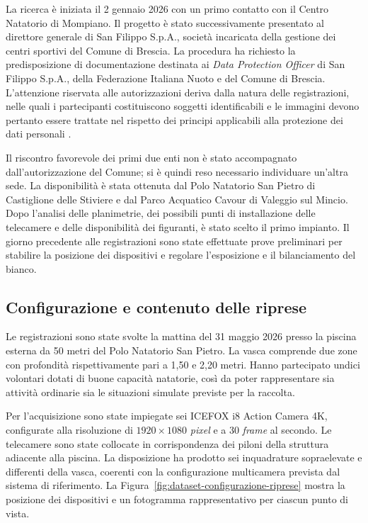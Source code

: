 La ricerca è iniziata il 2 gennaio 2026 con un primo contatto con il Centro Natatorio di Mompiano. Il progetto è stato successivamente presentato al direttore generale di San Filippo S.p.A., società incaricata della gestione dei centri sportivi del Comune di Brescia. La procedura ha richiesto la predisposizione di documentazione destinata ai \textit{Data Protection Officer} di San Filippo S.p.A., della Federazione Italiana Nuoto e del Comune di Brescia. L'attenzione riservata alle autorizzazioni deriva dalla natura delle registrazioni, nelle quali i partecipanti costituiscono soggetti identificabili e le immagini devono pertanto essere trattate nel rispetto dei principi applicabili alla protezione dei dati personali \cite{EU2016GDPR}.

Il riscontro favorevole dei primi due enti non è stato accompagnato dall'autorizzazione del Comune; si è quindi reso necessario individuare un'altra sede. La disponibilità è stata ottenuta dal Polo Natatorio San Pietro di Castiglione delle Stiviere e dal Parco Acquatico Cavour di Valeggio sul Mincio. Dopo l'analisi delle planimetrie, dei possibili punti di installazione delle telecamere e delle disponibilità dei figuranti, è stato scelto il primo impianto. Il giorno precedente alle registrazioni sono state effettuate prove preliminari per stabilire la posizione dei dispositivi e regolare l'esposizione e il bilanciamento del bianco.

\subsection{Configurazione e contenuto delle riprese}

Le registrazioni sono state svolte la mattina del 31 maggio 2026 presso la piscina esterna da 50 metri del Polo Natatorio San Pietro. La vasca comprende due zone con profondità rispettivamente pari a 1{,}50 e 2{,}20 metri. Hanno partecipato undici volontari dotati di buone capacità natatorie, così da poter rappresentare sia attività ordinarie sia le situazioni simulate previste per la raccolta.

Per l'acquisizione sono state impiegate sei ICEFOX i8 Action Camera 4K, configurate alla risoluzione di $1920\times1080$ \textit{pixel} e a 30 \textit{frame} al secondo. Le telecamere sono state collocate in corrispondenza dei piloni della struttura adiacente alla piscina. La disposizione ha prodotto sei inquadrature sopraelevate e differenti della vasca, coerenti con la configurazione multicamera prevista dal sistema di riferimento. La Figura~\ref{fig:dataset-configurazione-riprese} mostra la posizione dei dispositivi e un fotogramma rappresentativo per ciascun punto di vista.

